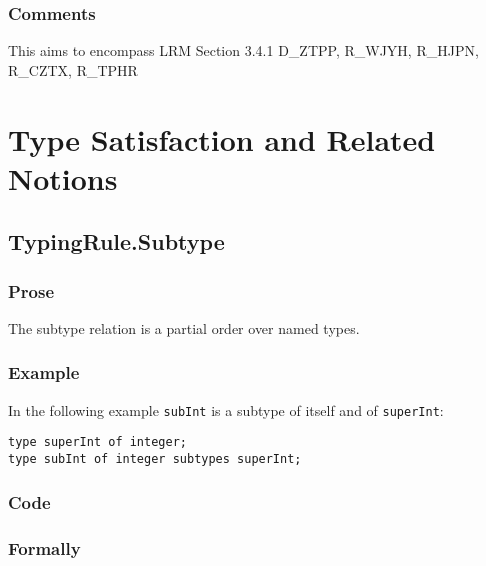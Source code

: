 \documentclass{book}
\begin{document}
\subsection{Comments}
    This aims to encompass LRM Section 3.4.1 D\_ZTPP, R\_WJYH, R\_HJPN, R\_CZTX, R\_TPHR

\chapter{Type Satisfaction and Related Notions}


\section{TypingRule.Subtype} 

  \subsection{Prose}
The subtype relation is a partial order over named types.

  \subsection{Example}
In the following example \texttt{subInt} is a subtype of itself and of \texttt{superInt}:
\begin{verbatim}
type superInt of integer;
type subInt of integer subtypes superInt;
\end{verbatim}
 
  \subsection{Code}
  
\begin{emptyformal}
    \subsection{Formally}
\end{emptyformal}
\end{document}
